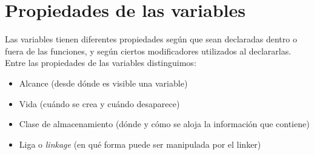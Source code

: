 \chapter{Propiedades de las variables}

Las variables tienen diferentes propiedades según que sean declaradas dentro o fuera de las funciones,
y según ciertos modificadores utilizados al declararlas. Entre las propiedades de las variables
distinguimos:

\begin{itemize}
	\item Alcance (desde dónde es visible una variable)
	\item Vida (cuándo se crea y cuándo desaparece)
	\item Clase de almacenamiento (dónde y cómo se aloja la información que contiene)
	\item Liga o \textit{linkage} (en qué forma puede ser manipulada por el linker)
\end{itemize}

